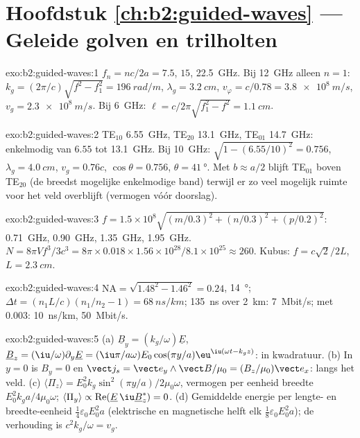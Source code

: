 \section*{Hoofdstuk \ref{ch:b2:guided-waves} --- Geleide golven en trilholten}

\begin{solution}{exo:b2:guided-waves:1}
$f_n = nc/2a = 7.5$, $15$, \qty{22.5}{GHz}. Bij \qty{12}{GHz} alleen
$n = 1$: $k_g =
(2\pi/c)\sqrt{f^2 - f_1^2} = \qty{196}{rad/m}$,
$\lambda_g = \qty{3.2}{cm}$, $v_\varphi = c/0.78
= \qty{3.8e8}{m/s}$,
$v_g = \qty{2.3e8}{m/s}$. Bij \qty{6}{GHz}:
$\ell = c/2\pi\sqrt{f_1^2 -
f^2} = \qty{1.1}{cm}$.
\end{solution}

\begin{solution}{exo:b2:guided-waves:2}
TE$_{10}$ \qty{6.55}{GHz}, TE$_{20}$ \qty{13.1}{GHz}, TE$_{01}$
\qty{14.7}{GHz}: enkelmodig van $6.55$ tot \qty{13.1}{GHz}. Bij
\qty{10}{GHz}: $\sqrt{1 - (6.55/10)^2} =
0.756$,
$\lambda_g = \qty{4.0}{cm}$, $v_g = 0.76c$, $\cos\theta = 0.756$,
$\theta = \qty{41}{\degree}$. Met $b \approx a/2$ blijft TE$_{01}$ boven
TE$_{20}$ (de breedst mogelijke enkelmodige band) terwijl er zo veel
mogelijk ruimte voor het veld overblijft (vermogen vóór doorslag).
\end{solution}

\begin{solution}{exo:b2:guided-waves:3}
$f = 1.5 \times 10^8\sqrt{(m/0.3)^2 + (n/0.3)^2 + (p/0.2)^2}$:
\qty{0.71}{GHz}, \qty{0.90}{GHz}, \qty{1.35}{GHz}, \qty{1.95}{GHz}.
$N = 8\pi Vf^3/3c^3 = 8\pi \times 0.018 \times 1.56 \times 10^{28}/
8.1 \times 10^{25} \approx 260$.
Kubus: $f = c\sqrt2/2L$, $L = \qty{2.3}{cm}$.
\end{solution}

\begin{solution}{exo:b2:guided-waves:4}
$\mathrm{NA} = \sqrt{1.48^2 - 1.46^2} = 0.24$, \qty{14}{\degree};
$\Delta t = (n_1L/c)(n_1/n_2
- 1) = \qty{68}{ns/km}$; \qty{135}{ns} over
\qty{2}{km}: \qty{7}{Mbit/s}; met $0.003$: \qty{10}{ns/km},
\qty{50}{Mbit/s}.
\end{solution}

\begin{solution}{exo:b2:guided-waves:5}
(a) $\underline B_y = (k_g/\omega)\underline E$,
$\underline B_z = (\iu/\omega)\partial_y\underline E = (\iu\pi/a\omega)
E_0\cos(\pi y/a)\eu^{\iu(\omega t - k_gz)}$:
in kwadratuur. (b) In $y = 0$ is $B_y = 0$ en
$\vect j_s = \vect e_y\wedge\vect B/\mu_0 = (B_z/\mu_0)\vect e_x$: langs het
veld. (c) $\langle\Pi_z\rangle = E_0^2k_g\sin^2(\pi y/a)/2\mu_0\omega$,
vermogen per eenheid breedte $E_0^2k_ga/4\mu_0\omega$;
$\langle\Pi_y\rangle \propto \operatorname{Re}(\underline E\,\iu\underline B_z^*)
= 0$.
(d) Gemiddelde energie per lengte- en breedte-eenheid
$\tfrac14\varepsilon_0E_0^2a$ (elektrische en magnetische helft elk
$\tfrac18\varepsilon_0E_0^2a$); de verhouding is $c^2k_g/\omega = v_g$.
\end{solution}

